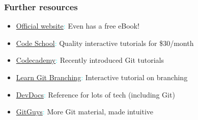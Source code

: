 \documentclass[glossy]{beamer}
\begin{document}
\begin{frame}[fragile=singleslide]
  \frametitle{Further resources}

  \begin{itemize}
    \item \textcolor{cyan}{\href{https://git-scm.com/}{Official website}:} Even has a free eBook!
    \item \textcolor{cyan}{\href{https://www.codeschool.com/}{Code School}:} Quality interactive tutorials for \$30/month
    \item \textcolor{cyan}{\href{https://www.codecademy.com/}{Codecademy}:} Recently introduced Git tutorials
    \item \textcolor{cyan}{\href{http://pcottle.github.io/learnGitBranching/}{Learn Git Branching}:} Interactive tutorial on branching
    \item \textcolor{cyan}{\href{http://devdocs.io/}{DevDocs}:} Reference for lots of tech (including Git)
    \item \textcolor{cyan}{\href{http://www.gitguys.com/}{GitGuys}:} More Git material, made intuitive
  \end{itemize}
\end{frame}
\end{document}
